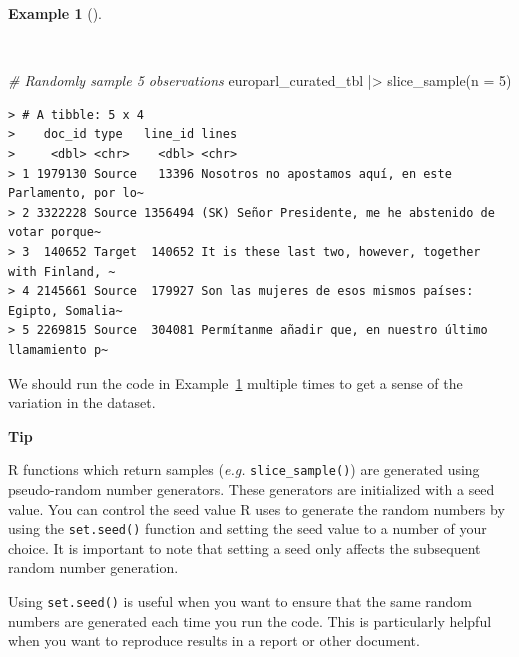 \documentclass[
  letterpaper,
  DIV=11,
  numbers=noendperiod]{scrreport}
\newenvironment{Shaded}{\begin{snugshade}}{\end{snugshade}}
\newcommand{\AttributeTok}[1]{\textcolor[rgb]{0.00,0.00,0.00}{#1}}
\newcommand{\CommentTok}[1]{\textcolor[rgb]{0.00,0.00,0.00}{\textit{#1}}}
\newcommand{\DecValTok}[1]{\textcolor[rgb]{0.00,0.00,0.00}{#1}}
\newcommand{\FunctionTok}[1]{\textcolor[rgb]{0.00,0.00,0.00}{#1}}
\newcommand{\NormalTok}[1]{\textcolor[rgb]{0.00,0.00,0.00}{#1}}
\newcommand{\SpecialCharTok}[1]{\textcolor[rgb]{0.00,0.00,0.00}{#1}}
\theoremstyle{definition}
\newtheorem{example}{Example}[chapter]
\theoremstyle{remark}
\begin{document}
\begin{example}[]\protect\hypertarget{exm-td-europarl-sample-1}{}\label{exm-td-europarl-sample-1}

~

\begin{Shaded}
\begin{Highlighting}[]
\CommentTok{\# Randomly sample 5 observations}
\NormalTok{europarl\_curated\_tbl }\SpecialCharTok{|\textgreater{}}
  \FunctionTok{slice\_sample}\NormalTok{(}\AttributeTok{n =} \DecValTok{5}\NormalTok{)}
\end{Highlighting}
\end{Shaded}

\begin{verbatim}
> # A tibble: 5 x 4
>    doc_id type   line_id lines                                                  
>     <dbl> <chr>    <dbl> <chr>                                                  
> 1 1979130 Source   13396 Nosotros no apostamos aquí, en este Parlamento, por lo~
> 2 3322228 Source 1356494 (SK) Señor Presidente, me he abstenido de votar porque~
> 3  140652 Target  140652 It is these last two, however, together with Finland, ~
> 4 2145661 Source  179927 Son las mujeres de esos mismos países: Egipto, Somalia~
> 5 2269815 Source  304081 Permítanme añadir que, en nuestro último llamamiento p~
\end{verbatim}

\end{example}

We should run the code in Example~\ref{exm-td-europarl-sample-1}
multiple times to get a sense of the variation in the dataset.

\begin{tcolorbox}[enhanced jigsaw, leftrule=.75mm, bottomrule=.15mm, opacityback=0, breakable, left=2mm, colback=white, toprule=.15mm, arc=.35mm, rightrule=.15mm]

\textbf{ Tip}

R functions which return samples (\emph{e.g.} \texttt{slice\_sample()})
are generated using pseudo-random number generators. These generators
are initialized with a seed value. You can control the seed value R uses
to generate the random numbers by using the \texttt{set.seed()} function
and setting the seed value to a number of your choice. It is important
to note that setting a seed only affects the subsequent random number
generation.

Using \texttt{set.seed()} is useful when you want to ensure that the
same random numbers are generated each time you run the code. This is
particularly helpful when you want to reproduce results in a report or
other document.

\end{tcolorbox}
\end{document}
